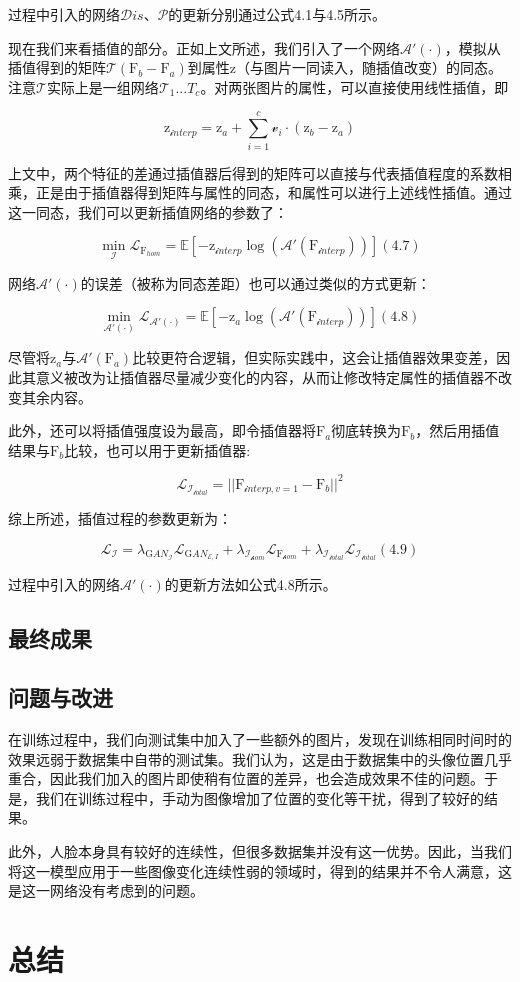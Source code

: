 \documentclass[UTF8,a4paper，12pt]{article}
\def\MC {\mathcal}
\theoremstyle{theorem}
\theoremstyle{definition}
\begin{document}
过程中引入的网络$\MC Dis$、$\MC P$的更新分别通过公式4.1与4.5所示。

现在我们来看插值的部分。正如上文所述，我们引入了一个网络$\MC A'(\cdot)$，模拟从插值得到的矩阵$\MC T(\mathrm F_b - \mathrm F_a)$到属性$\mathrm z$（与图片一同读入，随插值改变）的同态。注意$\MC T$实际上是一组网络$\MC T_1...T_c$。对两张图片的属性，可以直接使用线性插值，即

$$\mathrm z_{\MC interp} = \mathrm z_a + \sum_{i=1}^{c}{\MC v_i \cdot (\mathrm z_b - \mathrm z_a)}$$

上文中，两个特征的差通过插值器后得到的矩阵可以直接与代表插值程度的系数相乘，正是由于插值器得到矩阵与属性的同态，和属性可以进行上述线性插值。通过这一同态，我们可以更新插值网络的参数了：

$$\min_ {\MC I} \MC L_{\mathrm F_{hom}} = \mathbb E [-\mathrm z_{\MC interp}\log(\MC A'(\mathrm F_{\MC interp}))]    (4.7)$$

网络$\MC A'(\cdot)$的误差（被称为同态差距）也可以通过类似的方式更新：

$$\min_ {\MC A'(\cdot)} \MC L_{\MC A'(\cdot)} = \mathbb E [-\mathrm z_a\log(\MC A'(\mathrm F_{\MC interp}))]    (4.8)$$

尽管将$\mathrm z_a$与$\MC A'(\mathrm F_a)$比较更符合逻辑，但实际实践中，这会让插值器效果变差，因此其意义被改为让插值器尽量减少变化的内容，从而让修改特定属性的插值器不改变其余内容。

此外，还可以将插值强度设为最高，即令插值器将$\mathrm F_a$彻底转换为$\mathrm F_b$，然后用插值结果与$\mathrm F_b$比较，也可以用于更新插值器:

$$\MC L_{\MC I_{\MC total}} = ||\mathrm F_{\MC interp,v=1} - \mathrm F_b||^2$$

综上所述，插值过程的参数更新为：

$$\MC L_{\MC I} = \lambda_{\mathrm GAN_{\MC I}}\MC L_{\mathrm GAN_{\MC E,I}} + \lambda_{\MC I_{\MC hom}}\MC L_{\mathrm F_{\MC hom}} + \lambda_{\MC I_{\MC total}}\MC L_{\MC I_{\MC total}}    (4.9)$$

过程中引入的网络$\MC A'(\cdot)$的更新方法如公式4.8所示。

\subsection{最终成果}

\subsection{问题与改进}

在训练过程中，我们向测试集中加入了一些额外的图片，发现在训练相同时间时的效果远弱于数据集中自带的测试集。我们认为，这是由于数据集中的头像位置几乎重合，因此我们加入的图片即使稍有位置的差异，也会造成效果不佳的问题。于是，我们在训练过程中，手动为图像增加了位置的变化等干扰，得到了较好的结果。

此外，人脸本身具有较好的连续性，但很多数据集并没有这一优势。因此，当我们将这一模型应用于一些图像变化连续性弱的领域时，得到的结果并不令人满意，这是这一网络没有考虑到的问题。

\section{总结}
\end{document}
